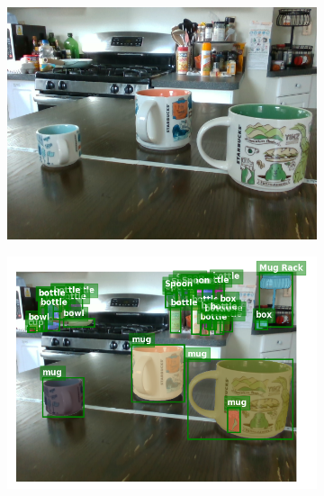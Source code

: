\documentclass{article}
\begin{document}
\begin{figure}[]
    \centering

    \begin{subfigure}{(\linewidth - 0.05\linewidth)/5}
        \centering
        \includegraphics[width=\linewidth]{figures/real2sim2real/2/1.png}
    \end{subfigure}
    \begin{subfigure}{(\linewidth - 0.05\linewidth)/5}
        \centering
        \includegraphics[width=\linewidth]{figures/real2sim2real/2/0.png}
    \end{subfigure}
    \begin{subfigure}{(\linewidth - 0.05\linewidth)/5}
        \centering

\end{subfigure}
\end{figure}
\end{document}

